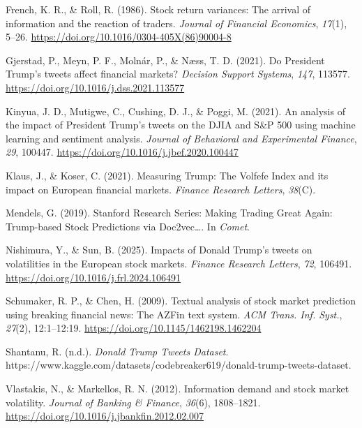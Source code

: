 \documentclass[
]{article}
\newlength{\cslhangindent}
\newenvironment{CSLReferences}[2] %
 {\begin{list}{}{%
  \setlength{\itemindent}{0pt}
  \setlength{\leftmargin}{0pt}
  \setlength{\parsep}{0pt}
  \ifodd #1
   \setlength{\leftmargin}{\cslhangindent}
   \setlength{\itemindent}{-1\cslhangindent}
  \fi
  \setlength{\itemsep}{#2\baselineskip}}}
 {\end{list}}
\begin{document}
\begin{CSLReferences}{1}{0}
French, K. R., \& Roll, R. (1986). Stock return variances: {The} arrival of information and the reaction of traders. \emph{Journal of Financial Economics}, \emph{17}(1), 5--26. \url{https://doi.org/10.1016/0304-405X(86)90004-8}

Gjerstad, P., Meyn, P. F., Molnár, P., \& Næss, T. D. (2021). Do {President Trump}'s tweets affect financial markets? \emph{Decision Support Systems}, \emph{147}, 113577. \url{https://doi.org/10.1016/j.dss.2021.113577}

Kinyua, J. D., Mutigwe, C., Cushing, D. J., \& Poggi, M. (2021). An analysis of the impact of {President Trump}'s tweets on the {DJIA} and {S}\&{P} 500 using machine learning and sentiment analysis. \emph{Journal of Behavioral and Experimental Finance}, \emph{29}, 100447. \url{https://doi.org/10.1016/j.jbef.2020.100447}

Klaus, J., \& Koser, C. (2021). Measuring {Trump}: {The Volfefe Index} and its impact on {European} financial markets. \emph{Finance Research Letters}, \emph{38}(C).

Mendels, G. (2019). Stanford {Research Series}: {Making Trading Great Again}: {Trump-based Stock Predictions} via Doc2vec{\ldots{}}. In \emph{Comet}.

Nishimura, Y., \& Sun, B. (2025). Impacts of {Donald Trump}'s tweets on volatilities in the {European} stock markets. \emph{Finance Research Letters}, \emph{72}, 106491. \url{https://doi.org/10.1016/j.frl.2024.106491}

Schumaker, R. P., \& Chen, H. (2009). Textual analysis of stock market prediction using breaking financial news: {The AZFin} text system. \emph{ACM Trans. Inf. Syst.}, \emph{27}(2), 12:1--12:19. \url{https://doi.org/10.1145/1462198.1462204}

Shantanu, R. (n.d.). \emph{Donald {Trump Tweets Dataset}}. https://www.kaggle.com/datasets/codebreaker619/donald-trump-tweets-dataset.

Vlastakis, N., \& Markellos, R. N. (2012). Information demand and stock market volatility. \emph{Journal of Banking \& Finance}, \emph{36}(6), 1808--1821. \url{https://doi.org/10.1016/j.jbankfin.2012.02.007}

\end{CSLReferences}
\end{document}
